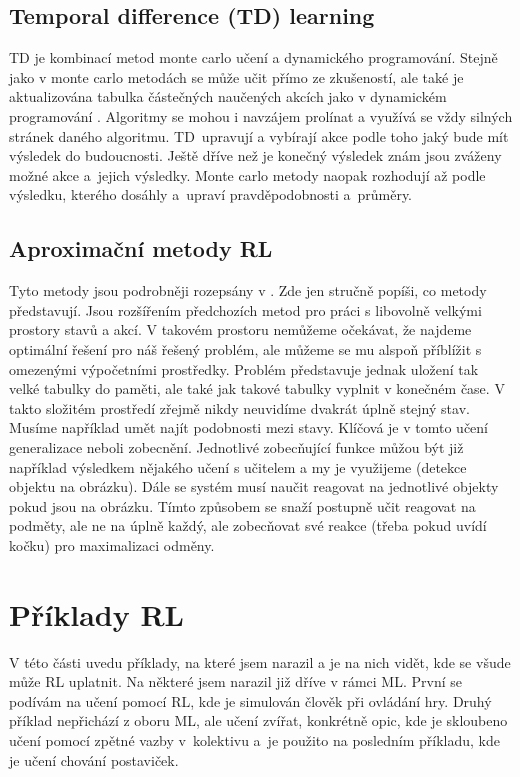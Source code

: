 \documentclass{article}
\begin{document}
\subsection{Temporal difference (TD) learning}
TD je kombinací metod monte carlo učení a dynamického programování. Stejně jako v monte carlo metodách se může učit přímo ze zkušeností, ale také je aktualizována tabulka částečných naučených akcích jako v dynamickém programování \cite{sutton1998introduction}. Algoritmy se mohou i navzájem prolínat a využívá se vždy silných stránek daného algoritmu. TD~upravují a vybírají akce podle toho jaký bude mít výsledek do budoucnosti. Ještě dříve než je konečný výsledek znám jsou zváženy možné akce a~jejich výsledky. Monte carlo metody naopak rozhodují až podle výsledku, kterého dosáhly a~upraví pravděpodobnosti a~průměry.


\subsection{Aproximační metody RL}

Tyto metody jsou podrobněji rozepsány v \cite{sutton1998introduction}. Zde jen stručně popíši, co metody představují. Jsou rozšířením předchozích metod pro práci s libovolně velkými prostory stavů a akcí. V takovém prostoru nemůžeme očekávat, že najdeme optimální řešení pro náš řešený problém, ale můžeme se mu alspoň příblížit s omezenými výpočetními prostředky. Problém představuje jednak uložení tak velké tabulky do paměti, ale také jak takové tabulky vyplnit v konečném čase. V takto složitém prostředí zřejmě nikdy neuvidíme dvakrát úplně stejný stav. Musíme například umět najít podobnosti mezi stavy. Klíčová je v tomto učení generalizace neboli zobecnění. Jednotlivé zobecňující funkce můžou být již například výsledkem nějakého učení s učitelem a my je využijeme (detekce objektu na obrázku). Dále se systém musí naučit reagovat na jednotlivé objekty pokud jsou na obrázku. Tímto způsobem se snaží postupně učit reagovat na podměty, ale ne na úplně každý, ale zobecňovat své reakce (třeba pokud uvídí kočku) pro maximalizaci odměny. 


\section{Příklady RL}
\label{sec:priklady}
V této části uvedu příklady, na které jsem narazil a je na nich vidět, kde se všude může RL uplatnit. Na některé jsem narazil již dříve v rámci ML. První se podívám na učení pomocí RL, kde je simulován člověk při ovládání hry. Druhý příklad nepřichází z oboru ML, ale učení zvířat, konkrétně opic, kde je skloubeno učení pomocí zpětné vazby v~kolektivu a~je použito na posledním příkladu, kde je učení chování postaviček. 
\end{document}
